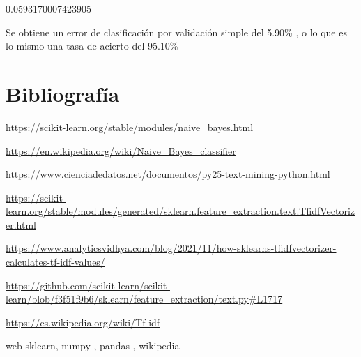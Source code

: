 \documentclass[
  11pt,
  a4paper,
]{article}
\begin{document}
0.0593170007423905

Se obtiene un error de clasificación por validación simple del 5.90\% ,
o lo que es lo mismo una tasa de acierto del 95.10\%

\newpage

\hypertarget{bibliografuxeda}{%
\section{Bibliografía}\label{bibliografuxeda}}

\url{https://scikit-learn.org/stable/modules/naive_bayes.html}

\url{https://en.wikipedia.org/wiki/Naive_Bayes_classifier}

\url{https://www.cienciadedatos.net/documentos/py25-text-mining-python.html}

\url{https://scikit-learn.org/stable/modules/generated/sklearn.feature_extraction.text.TfidfVectorizer.html}

\url{https://www.analyticsvidhya.com/blog/2021/11/how-sklearns-tfidfvectorizer-calculates-tf-idf-values/}

\url{https://github.com/scikit-learn/scikit-learn/blob/f3f51f9b6/sklearn/feature_extraction/text.py\#L1717}

\url{https://es.wikipedia.org/wiki/Tf-idf}

web sklearn, numpy , pandas , wikipedia
\end{document}
